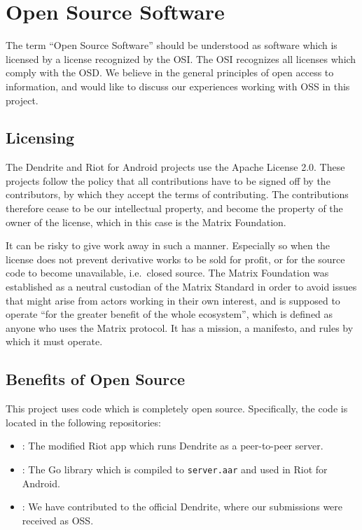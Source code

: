 \section{Open Source Software}\label{sec:open_source}
The term ``Open Source Software'' should be understood as software which is licensed by a license recognized by the \ac{OSI}\cite{open_source_initiative}.
The \ac{OSI} recognizes all licenses which comply with the \ac{OSD}\cite{open_source_definition}.
We believe in the general principles of open access to information, and would like to discuss our experiences working with \ac{OSS} in this project.

\subsection{Licensing}\label{subsec:licensing}
The Dendrite and Riot for Android projects use the Apache License 2.0\cite{apache_2pt0}.
These projects follow the policy that all contributions have to be signed off by the contributors, by which they accept the terms of contributing.
The contributions therefore cease to be our intellectual property, and become the property of the owner of the license, which in this case is the Matrix Foundation.

It can be risky to give work away in such a manner.
Especially so when the license does not prevent derivative works to be sold for profit, or for the source code to become unavailable, i.e.~closed source.
The Matrix Foundation was established as a neutral custodian of the Matrix Standard in order to avoid issues that might arise from actors working in their own interest, and is supposed to operate ``for the greater benefit of the whole ecosystem'', which is defined as anyone who uses the Matrix protocol\cite{matrix_org_foundation}.
It has a mission, a manifesto, and rules by which it must operate.

\subsection{Benefits of Open Source}\label{subsec:benefits_of_open_source}
This project uses code which is completely open source.
Specifically, the code is located in the following repositories:
\begin{itemize}
	\item{
	      :
	      The modified Riot app which runs Dendrite as a peer-to-peer server.
	      }
	\item{
	      :
	      The Go library which is compiled to \texttt{server.aar} and used in Riot for Android.
	      }
	\item{
	      :
	      We have contributed to the official Dendrite, where our submissions were received as \ac{OSS}.
	      }
\end{itemize}

